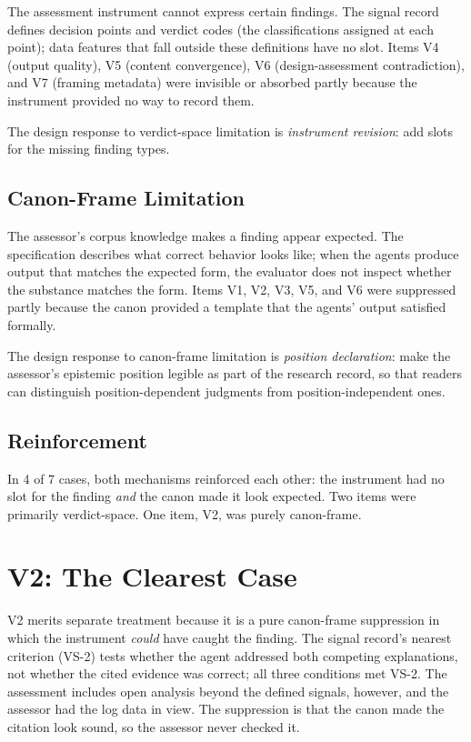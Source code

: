 \documentclass[11pt,a4paper]{article}
\begin{document}
The assessment instrument cannot express certain findings. The signal record
defines decision points and verdict codes (the classifications assigned at each
point); data features that fall outside these
definitions have no slot. Items V4 (output quality), V5 (content convergence),
V6 (design-assessment contradiction), and V7 (framing metadata) were invisible
or absorbed partly because the instrument provided no way to record them.

The design response to verdict-space limitation is \emph{instrument revision}:
add slots for the missing finding types.

\subsection{Canon-Frame Limitation}

The assessor's corpus knowledge makes a finding appear expected. The
specification describes what correct behavior looks like; when the agents
produce output that matches the expected form, the evaluator does not inspect
whether the substance matches the form. Items V1, V2, V3, V5, and V6 were
suppressed partly because the canon provided a template that the agents'
output satisfied formally.

The design response to canon-frame limitation is \emph{position declaration}:
make the assessor's epistemic position legible as part of the research record,
so that readers can distinguish position-dependent judgments from
position-independent ones.

\subsection{Reinforcement}

In 4 of 7 cases, both mechanisms reinforced each other: the instrument had no
slot for the finding \emph{and} the canon made it look expected. Two items were
primarily verdict-space. One item, V2, was purely canon-frame.

\section{V2: The Clearest Case}

V2 merits separate treatment because it is a pure canon-frame suppression in
which the instrument \emph{could} have caught the finding. The signal record's
nearest criterion (VS-2) tests whether the agent addressed both competing
explanations, not whether the cited evidence was correct; all three conditions
met VS-2. The assessment includes open analysis beyond the defined signals,
however, and the assessor had the log data in view. The suppression is that the
canon made the citation look sound, so the assessor never checked it.
\end{document}
